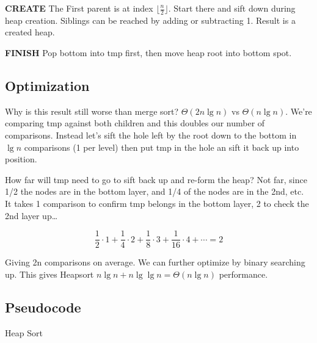 \documentclass[english, 10pt]{article}
\begin{document}
\textbf{CREATE} The First parent is at index $\lfloor \frac{n}{2} \rfloor$.
Start there and sift down during heap creation. Siblings can be reached by
adding or subtracting 1. Result is a created heap.

\textbf{FINISH} Pop bottom into tmp first, then move heap root into bottom
spot.

\subsection{Optimization}
Why is this result still worse than merge sort? $\Theta(2n\lg n)$ vs
$\Theta(n\lg n)$.  We're comparing tmp against both children and this doubles
our number of comparisons. Instead let's sift the hole left by the root down to
the bottom in $\lg n$ comparisons (1 per level) then put tmp in the hole an sift
it back up into position.

How far will tmp need to go to sift back up and re-form the heap? Not far,
since 1/2 the nodes are in the bottom layer, and 1/4 of the nodes are in the
2nd, etc. It takes 1 comparison to confirm tmp belongs in the bottom layer, 2
to check the 2nd layer up\ldots

$$\frac{1}{2}\cdot1 + \frac{1}{4}\cdot2 + \frac{1}{8}\cdot3 + \frac{1}{16}\cdot4+\cdots = 2$$

Giving 2n comparisons on average. We can further optimize by binary searching
up. This gives Heapsort $ n\lg n + n\lg\lg n= \Theta(n\lg n)$ performance.

\subsection{Pseudocode}
\begin{algorithm}[H]
    \DontPrintSemicolon%

    \caption{Heap Sort}
\end{algorithm}
\end{document}
